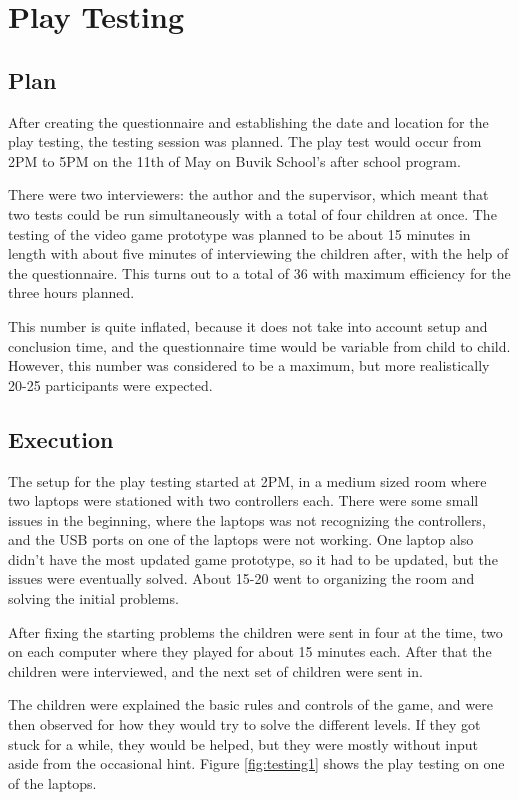 \chapter{Play Testing}
\label{chp:play_test}
\section{Plan}
After creating the questionnaire and establishing the date and location for the play testing, the testing session was planned. The play test would occur from 2PM to 5PM on the 11th of May on Buvik School's after school program. 

There were two interviewers: the author and the supervisor, which meant that two tests could be run simultaneously with a total of four children at once. The testing of the video game prototype was planned to be about 15 minutes in length with about five minutes of interviewing the children after, with the help of the questionnaire. This turns out to a total of 36 with maximum efficiency for the three hours planned. 

This number is quite inflated, because it does not take into account setup and conclusion time, and the questionnaire time would be variable from child to child. However, this number was considered to be a maximum, but more realistically 20-25 participants were expected.


\section{Execution}
The setup for the play testing started at 2PM, in a medium sized room where two laptops were stationed with two controllers each. There were some small issues in the beginning, where the laptops was not recognizing the controllers, and the USB ports on one of the laptops were not working. One laptop also didn't have the most updated game prototype, so it had to be updated, but the issues were eventually solved. About 15-20 went to organizing the room and solving the initial problems.

After fixing the starting problems the children were sent in four at the time, two on each computer where they played for about 15 minutes each. After that the children were interviewed, and the next set of children were sent in.

The children were explained the basic rules and controls of the game, and were then observed for how they would try to solve the different levels. If they got stuck for a while, they would be helped, but they were mostly without input aside from the occasional hint. Figure \ref{fig:testing1} shows the play testing on one of the laptops.

